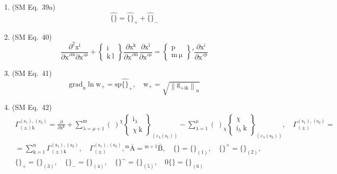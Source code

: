 \documentclass[12pt]{article}
\begin{document}
\begin{enumerate}[label=(\arabic*), series=formellist]
    \item (SM Eq.\ 39a) 
    \[
    \widehat{\{\}} = \widehat{\{\}}_+ + \widehat{\{\}}_-
    \]

    \item (SM Eq.\ 40) 
    \[
    \frac{\partial^2 \mathrm{x^i}}{\partial \mathrm{x'^m} \partial \mathrm{x'^\mu}} + \left\{ \begin{smallmatrix} \mathrm{i} \\ \mathrm{k\ l} \end{smallmatrix} \right\} \frac{\partial \mathrm{x^k}}{\partial \mathrm{x'^m}} \frac{\partial \mathrm{x^l}}{\partial \mathrm{x'^\mu}} = \left\{ \begin{smallmatrix} \mathrm{p} \\ \mathrm{m\ \mu} \end{smallmatrix} \right\}' \frac{\partial \mathrm{x^i}}{\partial \mathrm{x'^p}}
    \]

    \item (SM Eq.\ 41) 
    \[
    \mathrm{grad}_\mathrm{n} \ln \mathrm{w}_+ = \mathrm{sp} \widehat{\{\}}_+, \quad \mathrm{w}_+ = \sqrt{\left\| \mathrm{g}_{+\mathrm{ik}} \right\|_\mathrm{n}}
    \]

    \item (SM Eq.\ 42) 
    \[
    \begin{gathered}
    \Gamma^{(\mathrm{s}_1), (\mathrm{s}_2)}_{(\pm)\mathrm{k}} = \frac{\partial}{\partial \mathrm{x^k}} + \sum_{\lambda=\mu+1}^{\mathrm{m}} (\ )^\chi \left\{ \begin{smallmatrix} \mathrm{i}_\lambda \\ \chi\ \mathrm{k} \end{smallmatrix} \right\}_{(\varepsilon_\lambda(\mathrm{s}_1))} - \sum_{\lambda=1}^{\mu} (\ )_\chi \left\{ \begin{smallmatrix} \chi \\ \mathrm{i}_\lambda\ \mathrm{k} \end{smallmatrix} \right\}_{(\varepsilon_\lambda(\mathrm{s}_2))}, \quad \Gamma^{(\mathrm{s}_1), (\mathrm{s}_2)}_{(\pm)} = \\
    = \sum_{\mathrm{k}=1}^\mathrm{n} \Gamma^{(\mathrm{s}_1), (\mathrm{s}_2)}_{(\pm)\mathrm{k}}, \quad \Gamma^{(\mathrm{s}_1), (\mathrm{s}_2)}_{(\pm)}, {}^\mathrm{m}\bar{\mathrm{A}} = {}^{\mathrm{m}+1}\bar{\mathrm{B}}, \quad \{ \} = \{ \}_{(1)}, \quad \{ \}^\times = \{ \}_{(2)}, \\
    \{ \}_+ = \{ \}_{(3)}, \quad \{ \}_- = \{ \}_{(4)}, \quad \{ \}^\sim = \{ \}_{(5)}, \quad 0\{ \} = \{ \}_{(6)}
    \end{gathered}
    \]


\end{enumerate}
\end{document}
